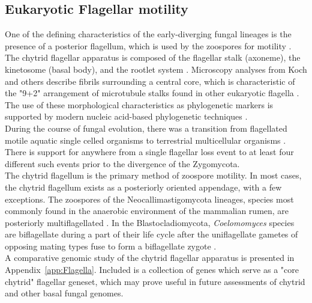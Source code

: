 \subsection*{Eukaryotic Flagellar motility}
One of the defining characteristics of the early-diverging fungal
lineages is the presence of a posterior flagellum, which is used by
the zoospores for motility \cite{Koch1958motileI}. The chytrid flagellar
apparatus is composed of the flagellar stalk (axoneme), the kinetosome
(basal body), and the rootlet system \cite{Barr1981}. Microscopy analyses from Koch 
and others \cite{} describe fibrils surrounding a central core, which is characteristic of the
"9+2" arrangement of microtubule stalks found in other eukaryotic flagella \cite{}. The use of 
these morphological characteristics as phylogenetic markers is supported by modern nucleic 
acid-based phylogenetic techniques \cite{James}.\\
\indent During the course of fungal evolution, there was a transition from flagellated motile aquatic single celled organisms to terrestrial multicellular organisms \cite{Taylor2006,Stajich2009}. There is support for anywhere from a single flagellar loss event \cite{Liu2006} to at least four different such events \cite{James2006sixGene} prior to the divergence of the Zygomycota.\\
\indent The chytrid flagellum is the primary method of zoospore motility. In most cases, the chytrid flagellum exists as a posteriorly oriented appendage, with a few exceptions. The zoospores of the Neocallimastigomycota lineages, species most commonly found in the anaerobic environment of the mammalian rumen, are posteriorly multiflagellated \cite{Ho1995}. In the Blastocladiomycota, \textit{Coelomomyces} species are biflagellate during a part of their life cycle after the uniflagellate gametes of opposing mating types fuse to form a biflagellate zygote \cite{Padua1986}.\\ 
\indent A comparative genomic study of the chytrid flagellar apparatus is presented in Appendix~\ref{app:Flagella}. Included is a collection of genes which serve as a "core chytrid" flagellar geneset, which may prove useful in future assessments of chytrid and other basal fungal genomes.\\
